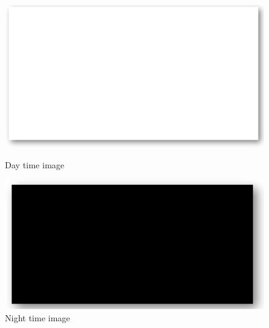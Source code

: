 \documentclass[report.tex]{subfiles}
\begin{document}
    \begin{figure}[h]
        \centering
        \begin{minipage}{0.4\textwidth}
            \centering
            \includegraphics[width=\textwidth]{images/methods/mtdetr/2018-10-29_15-09-31_01940_day.png}
            \caption{Day time image}
            \label{fig:mt_detr_day}
        \end{minipage}
        \hfill
        \begin{minipage}{0.45\textwidth}
            \centering
            \includegraphics[width=\textwidth]{images/methods/mtdetr/2018-02-03_22-04-43_00200_night.png}
            \caption{Night time image}
            \label{fig:mt_detr_night}
        \end{minipage}
    \end{figure}


\end{document}
